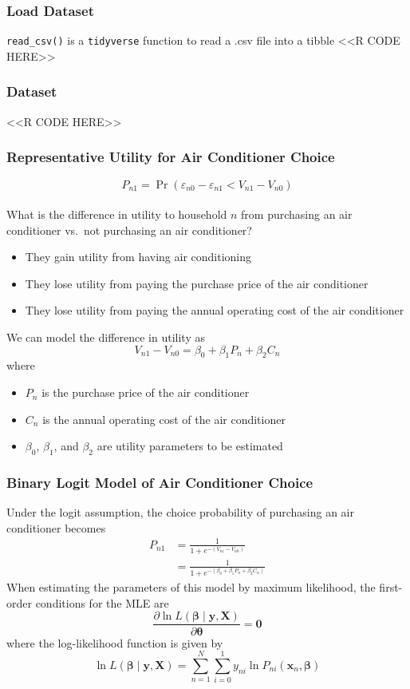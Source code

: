 \documentclass{beamer}
\begin{document}
\begin{frame}[fragile]\frametitle{Load Dataset}
    \texttt{read\_csv()} is a \texttt{tidyverse} function to read a .csv file into a tibble
    <<R CODE HERE>>
\end{frame}

\begin{frame}[fragile]\frametitle{Dataset}
    <<R CODE HERE>>
\end{frame}

\begin{frame}\frametitle{Representative Utility for Air Conditioner Choice}
    \vspace{-2ex}
    $$P_{n1} = \Pr(\varepsilon_{n0} - \varepsilon_{n1} < V_{n1} - V_{n0})$$ \\
    \vspace{1ex}
    What is the difference in utility to household $n$ from purchasing an air conditioner vs.\ not purchasing an air conditioner?
    \begin{itemize}
        \item They gain utility from having air conditioning
        \item They lose utility from paying the purchase price of the air conditioner
        \item They lose utility from paying the annual operating cost of the air conditioner
    \end{itemize}
    \vspace{2ex}
    We can model the difference in utility as
    $$V_{n1} - V_{n0} = \beta_0 + \beta_1 P_n + \beta_2 C_n$$
    where
    \begin{itemize}
        \item $P_n$ is the purchase price of the air conditioner
        \item $C_n$ is the annual operating cost of the air conditioner
        \item $\beta_0$, $\beta_1$, and $\beta_2$ are utility parameters to be estimated
    \end{itemize}
\end{frame}

\begin{frame}\frametitle{Binary Logit Model of Air Conditioner Choice}
    Under the logit assumption, the choice probability of purchasing an air conditioner becomes
    \begin{align*}
        P_{n1} & = \frac{1}{1 + e^{-(V_{n1} - V_{n0})}} \\
        & = \frac{1}{1 + e^{-(\beta_0 + \beta_1 P_n + \beta_2 C_n)}}
    \end{align*}
    When estimating the parameters of this model by maximum likelihood, the first-order conditions for the MLE are
    $$\frac{\partial \ln L(\bm{\beta} \mid \bm{y}, \bm{X})}{\partial \bm{\theta}} = \bm{0}$$
    where the log-likelihood function is given by
    $$\ln L(\bm{\beta} \mid \bm{y}, \bm{X}) = \sum_{n = 1}^N \sum_{i = 0}^1 y_{ni} \ln P_{ni}(\bm{x}_n, \bm{\beta})$$
\end{frame}
\end{document}
